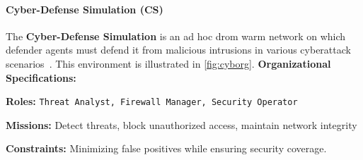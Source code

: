 \documentclass[pdflatex,sn-mathphys-num]{sn-jnl}%
\theoremstyle{thmstyleone}%
\theoremstyle{thmstyletwo}%
\theoremstyle{thmstylethree}%
\begin{document}
\paragraph{Cyber-Defense Simulation (CS)}
The \textbf{Cyber-Defense Simulation} is an ad hoc drom warm network on which defender agents must defend it from malicious intrusions in various cyberattack scenarios~\cite{Standen2021}. This environment is illustrated in \autoref{fig:cyborg}.
%
%
\textbf{Organizational Specifications:}
\begin{enumerate*}[label={\roman*)}, itemjoin={; \quad}]
    \item \textbf{Roles:} \texttt{Threat Analyst, Firewall Manager, Security Operator}
    \item \textbf{Missions:} Detect threats, block unauthorized access, maintain network integrity
    \item \textbf{Constraints:} Minimizing false positives while ensuring security coverage.
\end{enumerate*}
\end{document}

